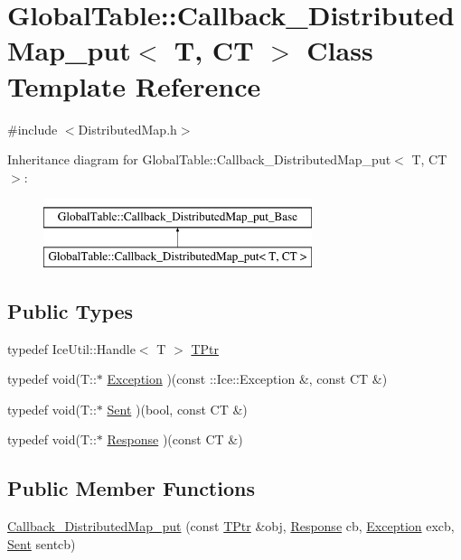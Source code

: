 \hypertarget{class_global_table_1_1_callback___distributed_map__put}{
\section{GlobalTable::Callback\_\-DistributedMap\_\-put$<$ T, CT $>$ Class Template Reference}
\label{class_global_table_1_1_callback___distributed_map__put}
}


{\ttfamily \#include $<$DistributedMap.h$>$}

Inheritance diagram for GlobalTable::Callback\_\-DistributedMap\_\-put$<$ T, CT $>$:\begin{figure}[H]
\begin{center}
\leavevmode
\includegraphics[height=2cm]{class_global_table_1_1_callback___distributed_map__put}
\end{center}
\end{figure}
\subsection*{Public Types}
\begin{DoxyCompactItemize}
\item 
typedef IceUtil::Handle$<$ T $>$ \hyperlink{class_global_table_1_1_callback___distributed_map__put_a8d386ecbc957ae5842d8f2973a4c7521}{TPtr}
\item 
typedef void(T::$\ast$ \hyperlink{class_global_table_1_1_callback___distributed_map__put_a0bb5bf4250e4c3dce4cf4dfc11d0987b}{Exception} )(const ::Ice::Exception \&, const CT \&)
\item 
typedef void(T::$\ast$ \hyperlink{class_global_table_1_1_callback___distributed_map__put_a737246880284bb296cbf1ba7d00773ee}{Sent} )(bool, const CT \&)
\item 
typedef void(T::$\ast$ \hyperlink{class_global_table_1_1_callback___distributed_map__put_a4b50418baab520b5caa0c4eaf74af95c}{Response} )(const CT \&)
\end{DoxyCompactItemize}
\subsection*{Public Member Functions}
\begin{DoxyCompactItemize}
\item 
\hyperlink{class_global_table_1_1_callback___distributed_map__put_a9d633085d71c5a605526c56240d5084d}{Callback\_\-DistributedMap\_\-put} (const \hyperlink{class_global_table_1_1_callback___distributed_map__put_a8d386ecbc957ae5842d8f2973a4c7521}{TPtr} \&obj, \hyperlink{class_global_table_1_1_callback___distributed_map__put_a4b50418baab520b5caa0c4eaf74af95c}{Response} cb, \hyperlink{class_global_table_1_1_callback___distributed_map__put_a0bb5bf4250e4c3dce4cf4dfc11d0987b}{Exception} excb, \hyperlink{class_global_table_1_1_callback___distributed_map__put_a737246880284bb296cbf1ba7d00773ee}{Sent} sentcb)
\end{DoxyCompactItemize}
